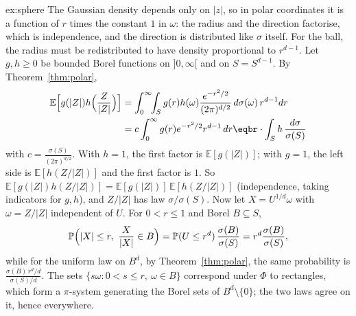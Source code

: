 \begin{solution}{ex:sphere}
\idea The Gaussian density depends only on $|z|$, so in polar coordinates it is a function of $r$ times the constant $1$ in $\omega$: the radius and the direction factorise, which is independence,
and the direction is distributed like $\sigma$ itself. For the ball, the radius must be redistributed to have density proportional to $r^{d-1}$.
\writeup Let $g,h\ge0$ be bounded Borel functions on $]0,\infty[$ and on $S=S^{d-1}$. By Theorem~\ref{thm:polar},
\[\begin{aligned}\mathbb E\Bigl[g(|Z|)h\Bigl(\frac Z{|Z|}\Bigr)\Bigr]&=\int_0^\infty\!\!\int_Sg(r)h(\omega)\frac{e^{-r^2/2}}{(2\pi)^{d/2}}\,d\sigma(\omega)\,r^{d-1}dr\\&=c\int_0^\infty g(r)e^{-r^2/2}r^{d-1}\,dr\eqbr\cdot\int_Sh\,\frac{d\sigma}{\sigma(S)}\end{aligned}\]
with $c=\frac{\sigma(S)}{(2\pi)^{d/2}}$. With $h=1$, the first factor is $\mathbb E[g(|Z|)]$; with $g=1$, the left side is $\mathbb E[h(Z/|Z|)]$ and the first factor is $1$. So
$\mathbb E[g(|Z|)h(Z/|Z|)]=\mathbb E[g(|Z|)]\,\mathbb E[h(Z/|Z|)]$ (independence, taking indicators for $g,h$), and $Z/|Z|$ has law $\sigma/\sigma(S)$. Now let $X=U^{1/d}\omega$ with $\omega=Z/|Z|$ independent of
$U$. For $0<r\le1$ and Borel $B\subseteq S$,
\[\mathbb P\Bigl(|X|\le r,\ \frac X{|X|}\in B\Bigr)=\mathbb P(U\le r^d)\,\frac{\sigma(B)}{\sigma(S)}=r^d\frac{\sigma(B)}{\sigma(S)},\]
while for the uniform law on $B^d$, by Theorem~\ref{thm:polar}, the same probability is $\frac{\sigma(B)\,r^d/d}{\sigma(S)/d}$. The sets $\{s\omega:0<s\le r,\ \omega\in B\}$ correspond under $\Phi$ to
rectangles, which form a $\pi$-system generating the Borel sets of $B^d\setminus\{0\}$; the two laws agree on it, hence everywhere.
\end{solution}

